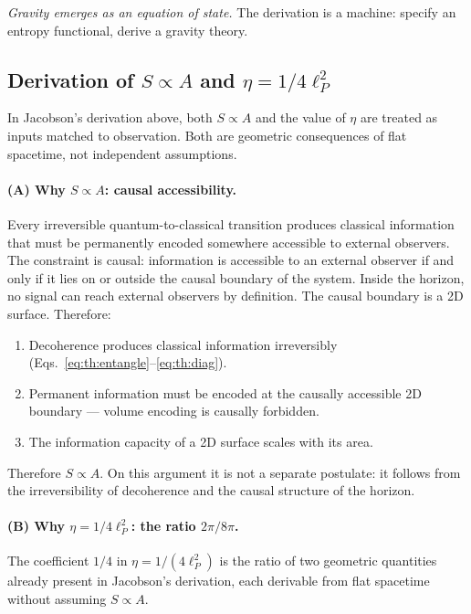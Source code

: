 \emph{Gravity emerges as an equation of state.} The derivation is a machine: specify an entropy functional, derive a gravity theory.

\subsection{Derivation of $S\propto A$ and $\eta=1/4\ell_P^2$}\label{sec:th:eta}
In Jacobson's derivation above, both $S\propto A$ and the value of $\eta$ are treated as inputs matched to observation. Both are geometric consequences
of flat spacetime, not independent assumptions.

\paragraph{(A) Why $S\propto A$: causal accessibility.} Every irreversible quantum-to-classical transition produces classical information that must be
permanently encoded somewhere accessible to external observers. The constraint is causal: information is accessible to an external observer if and
only if it lies on or outside the causal boundary of the system. Inside the horizon, no signal can reach external observers by definition. The causal
boundary is a 2D surface. Therefore:
\begin{enumerate}
\item Decoherence produces classical information irreversibly (Eqs.~\eqref{eq:th:entangle}--\eqref{eq:th:diag}).
\item Permanent information must be encoded at the causally accessible 2D boundary --- volume encoding is causally forbidden.
\item The information capacity of a 2D surface scales with its area.
\end{enumerate}
Therefore $S\propto A$. On this argument it is not a separate postulate: it follows from the irreversibility of decoherence and the causal structure of
the horizon. \interp

\paragraph{(B) Why $\eta=1/4\ell_P^2$: the ratio $2\pi/8\pi$.} The coefficient $1/4$ in $\eta=1/(4\ell_P^2)$ is the ratio of two geometric quantities
already present in Jacobson's derivation, each derivable from flat spacetime without assuming $S\propto A$.

